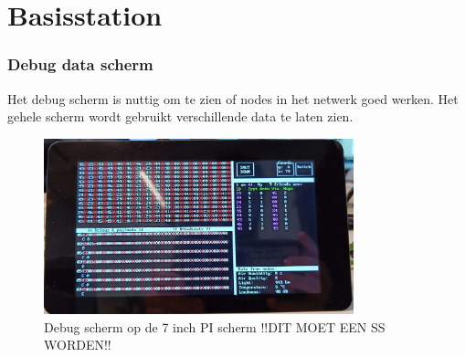 \section{Basisstation} \label{sec:basestation}





\subsubsection{Debug data scherm}
Het debug scherm is nuttig om te zien of nodes in het netwerk goed werken. 
Het gehele scherm wordt gebruikt verschillende data te laten zien. 
\begin{figure}[ht]
    \centering
    \includegraphics*[width=0.8\textwidth]{img/debugScherm.jpg}
    \caption{Debug scherm op de 7 inch PI scherm !!DIT MOET EEN SS WORDEN!!}
    \label{fig:debugSchermScreenshot}
\end{figure}

